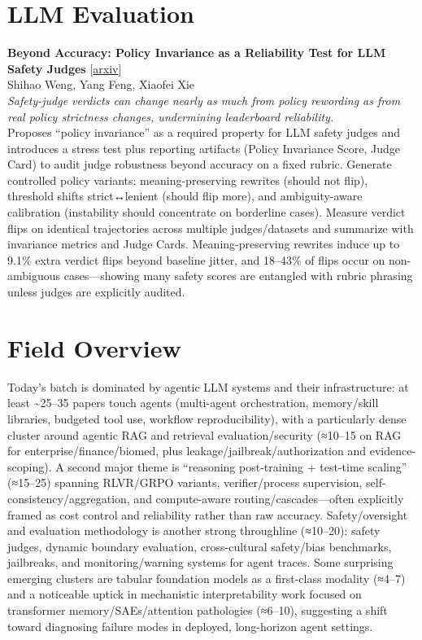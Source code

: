 \documentclass[12pt,letterpaper]{article}
\begin{document}
\medskip


\section*{LLM Evaluation}

{\small\textbf{Beyond Accuracy: Policy Invariance as a Reliability Test for LLM Safety Judges}} {\scriptsize[\href{https://arxiv.org/abs/2605.06161}{arxiv}]}\\
{\scriptsize Shihao Weng, Yang Feng, Xiaofei Xie}\\

{\small\textit{Safety-judge verdicts can change nearly as much from policy rewording as from real policy strictness changes, undermining leaderboard reliability.}}\\[1pt]
{\footnotesize Proposes ``policy invariance'' as a required property for LLM safety judges and introduces a stress test plus reporting artifacts (Policy Invariance Score, Judge Card) to audit judge robustness beyond accuracy on a fixed rubric. Generate controlled policy variants: meaning-preserving rewrites (should not flip), threshold shifts strict↔lenient (should flip more), and ambiguity-aware calibration (instability should concentrate on borderline cases). Measure verdict flips on identical trajectories across multiple judges/datasets and summarize with invariance metrics and Judge Cards. Meaning-preserving rewrites induce up to 9.1\% extra verdict flips beyond baseline jitter, and 18--43\% of flips occur on non-ambiguous cases---showing many safety scores are entangled with rubric phrasing unless judges are explicitly audited.}

\medskip



\section*{Field Overview}
{\footnotesize Today's batch is dominated by agentic LLM systems and their infrastructure: at least \textasciitilde{}25--35 papers touch agents (multi-agent orchestration, memory/skill libraries, budgeted tool use, workflow reproducibility), with a particularly dense cluster around agentic RAG and retrieval evaluation/security (≈10--15 on RAG for enterprise/finance/biomed, plus leakage/jailbreak/authorization and evidence-scoping). A second major theme is ``reasoning post-training + test-time scaling'' (≈15--25) spanning RLVR/GRPO variants, verifier/process supervision, self-consistency/aggregation, and compute-aware routing/cascades---often explicitly framed as cost control and reliability rather than raw accuracy. Safety/oversight and evaluation methodology is another strong throughline (≈10--20): safety judges, dynamic boundary evaluation, cross-cultural safety/bias benchmarks, jailbreaks, and monitoring/warning systems for agent traces. Some surprising emerging clusters are tabular foundation models as a first-class modality (≈4--7) and a noticeable uptick in mechanistic interpretability work focused on transformer memory/SAEs/attention pathologies (≈6--10), suggesting a shift toward diagnosing failure modes in deployed, long-horizon agent settings.}
\end{document}
